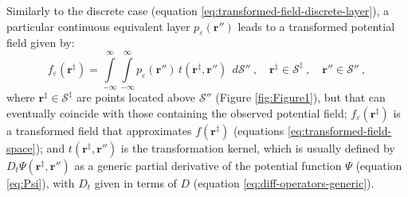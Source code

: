 Similarly to the discrete case (equation \ref{eq:transformed-field-discrete-layer}), a particular continuous equivalent layer 
$p_{\varepsilon}(\mathbf{r}'')$ leads to a transformed potential field given by:
\begin{equation}
	f_{\varepsilon}(\mathbf{r}^{\ddagger})
	= \int\limits_{-\infty}^{\infty}\int\limits_{-\infty}^{\infty}
	p_{\varepsilon}(\mathbf{r}'') \, t(\mathbf{r}^{\ddagger}, \mathbf{r}'') \:\: d\mathcal{S}'' \: , 
	\quad \mathbf{r}^{\ddagger} \in \mathcal{S}^{\ddagger} \: ,
	\quad \mathbf{r}'' \in \mathcal{S}'' \: ,
	\label{eq:transformed-field-continuous-layer}
\end{equation}
where $\mathbf{r}^{\ddagger} \in \mathcal{S}^{\ddagger}$ are points located above $\mathcal{S}''$ (Figure \ref{fig:Figure1}), 
but that can eventually coincide with those containing the observed potential field; 
$f_{\varepsilon}(\mathbf{r}^{\ddagger})$ is a transformed field that approximates 
$f(\mathbf{r}^{\ddagger})$ (equations \ref{eq:transformed-field-space}); and
$t(\mathbf{r}^{\ddagger}, \mathbf{r}'')$ is the transformation kernel,
which is usually defined by $D_{t} \Psi(\mathbf{r}^{\ddagger}, \mathbf{r}'')$ as a generic partial 
derivative of the potential function $\Psi$
(equation \ref{eq:Psi}), with $D_{t}$ given in terms of $D$ (equation \ref{eq:diff-operators-generic}).